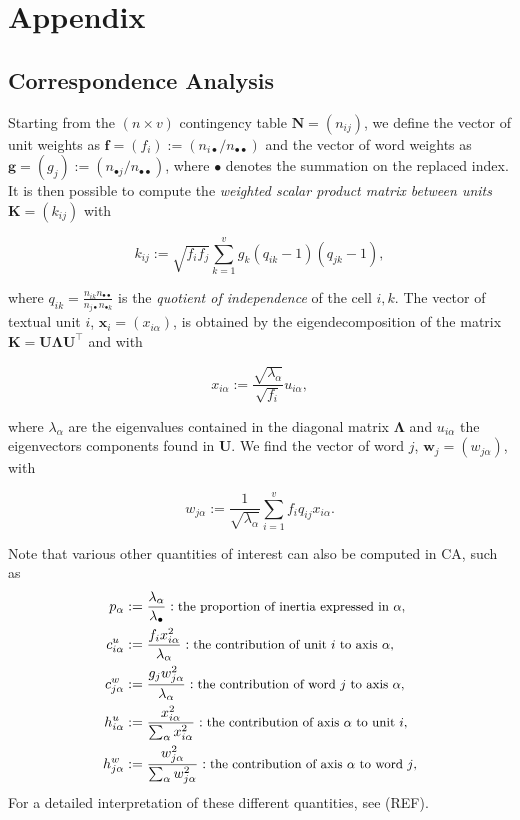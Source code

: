 \documentclass[
twocolumn,
]{ceurart}
\begin{document}
\section{Appendix}

\subsection{Correspondence Analysis}
\label{ca_details}

Starting from the $(n \times v)$ contingency table $\mathbf{N} = (n_{ij})$, we define the vector of unit weights as $\mathbf{f} = (f_i) := (n_{i\bullet}/n_{\bullet \bullet})$ and the vector of word weights as $\mathbf{g} = (g_j) := (n_{\bullet j}/n_{\bullet \bullet})$, where $\bullet$ denotes the summation on the replaced index. It is then possible to compute the \emph{weighted scalar product matrix between units} $\mathbf{K} = (k_{ij})$ with

\begin{equation}
k_{ij} := \sqrt{f_i f_j} \sum_{k=1}^{v} g_k(q_{ik} - 1)(q_{jk} - 1), 
\end{equation}

where $q_{ik} = \frac{n_{ik} n_{\bullet \bullet}}{n_{j \bullet} n_{\bullet k}}$ is the \emph{quotient of independence} of the cell $i, k$. The vector of textual unit $i$, $\mathbf{x}_i = (x_{i\alpha})$, is obtained by the eigendecomposition of the matrix $\mathbf{K} = \mathbf{U}\bm{\Lambda}\mathbf{U}^\top$ and with

\begin{equation}
x_{i\alpha} := \frac{\sqrt{\lambda_\alpha}}{\sqrt{f_i}} u_{i \alpha},
\end{equation}

where $\lambda_\alpha$ are the eigenvalues contained in the diagonal matrix $\bm{\Lambda}$ and $u_{i \alpha}$ the eigenvectors components found in $\mathbf{U}$. We find the vector of word $j$, $\mathbf{w}_j = (w_{j\alpha})$, with 

\begin{equation}
w_{j\alpha} := \frac{1}{\sqrt{\lambda_\alpha}} \sum_{i=1}^v f_i q_{ij} x_{i \alpha}.
\end{equation}

Note that various other quantities of interest can also be computed in CA, such as 
\begin{align*}
p_\alpha &:= \frac{\lambda_\alpha}{\lambda_\bullet} :\text{\small the proportion of inertia expressed in $\alpha$,} \\
c^u_{i \alpha} &:= \frac{f_i x_{i\alpha}^2}{\lambda_\alpha} : \text{\small the contribution of unit $i$ to axis $\alpha$,} \\
c^w_{j \alpha} &:= \frac{g_j w_{j\alpha}^2}{\lambda_\alpha} : \text{\small the contribution of word $j$ to axis $\alpha$,} \\
h^u_{i \alpha} &:= \frac{x_{i\alpha}^2}{\sum_{\alpha} x_{i\alpha}^2} : \text{\small the contribution of  axis $\alpha$ to unit $i$,} \\
h^w_{j \alpha} &:= \frac{w_{j\alpha}^2}{\sum_{\alpha} w_{j\alpha}^2} : \text{\small the contribution of  axis $\alpha$ to word $j$,}
\end{align*}
For a detailed interpretation of these different quantities, see (REF). 
\end{document}
